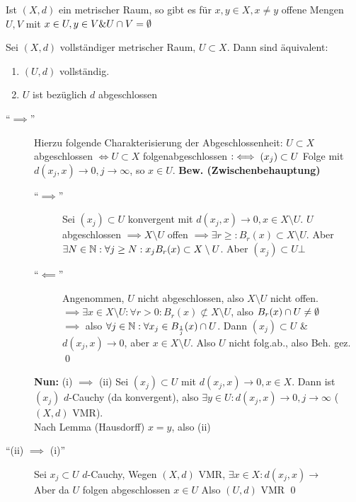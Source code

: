 \begin{sublemma*}
	Ist $ (X, d) $ ein metrischer Raum, so gibt es für $ x, y \in X, x \neq y $ offene Mengen $ U, V $ mit $ x \in U, y \in V \& U \cap V = \emptyset  $	
\end{sublemma*}

\begin{subtheorem}
	Sei $ (X, d) $ vollständiger metrischer Raum, $ U \subset X $. Dann sind äquivalent:
	\begin{enumerate}[label=(\roman*)]
		\item $ (U, d) $ vollständig.
		\item $ U $ ist bezüglich $ d $ abgeschlossen
	\end{enumerate}
\end{subtheorem}

\begin{subproof*}
	\begin{description}
		\item[``$ \implies  $''] Hierzu folgende Charakterisierung der Abgeschlossenheit:
			$ U \subset X $ abgeschlossen $ \iff U \subset X $ folgenabgeschlossen $ \vcentcolon\iff (x_j) \subset U $ Folge mit $ d(x_j, x) \to 0, j \to \infty $, so $ x \in U $.
			\textbf{Bew. (Zwischenbehauptung)}
			\begin{description}
				\item[``$ \implies  $''] Sei $ (x_j) \subset U $ konvergent mit $ d(x_j, x) \to 0, x \in X\setminus U $. $ U $ abgeschlossen $ \implies X\setminus U $ offen $ \implies \exists r \geq : B_{r}(x) \subset X \setminus U. $ Aber $ \exists N \in \mathbb{N} : \forall j \geq N : x_j B_{r}(x) \subset X \setminus U $. Aber $ (x_j) \subset U \bot $ 
				\item[``$ \impliedby  $''] Angenommen, $ U $ nicht abgeschlossen, also $ X \setminus U $ nicht offen. $ \implies \exists x \in X \setminus U : \forall r > 0 : B_{r}(x) \not \subset X \setminus U $, also $ B_{r}(x) \cap U \neq \emptyset  $\\
					$ \implies  $ also $ \forall j \in \mathbb{N} : \forall x_j \in B_{\frac{ 1 }{ j } }(x) \cap U $. Dann $ (x_j) \subset U $ \& $ d(x_j, x) \to 0 $, aber $ x \in X \setminus U $. Also $ U $ nicht folg.ab., also Beh. gez. \qed
			\end{description}
		\textbf{Nun:} (i) $ \implies  $ (ii) Sei $ (x_j) \subset U $ mit $ d(x_j, x) \to 0, x \in X $. Dann ist $ (x_j) $ $ d $-Cauchy (da konvergent), also $ \exists y \in U: d(x_j, x) \to 0, j \to \infty $ ( $ (X, d) $ VMR).\\
		Nach Lemma (Hausdorff) $ x = y $, also (ii)
	\item[``(ii) $ \implies  $ (i)''] Sei $ x_j \subset U $ $ d $-Cauchy, Wegen $ (X, d) $ VMR, $ \exists x \in X : d(x_j, x) \to  $\\
		Aber da $ U $ folgen abgeschlossen $ x \in U $ Also $ (U, d) $ VMR \qed
	\end{description}
\end{subproof*}

